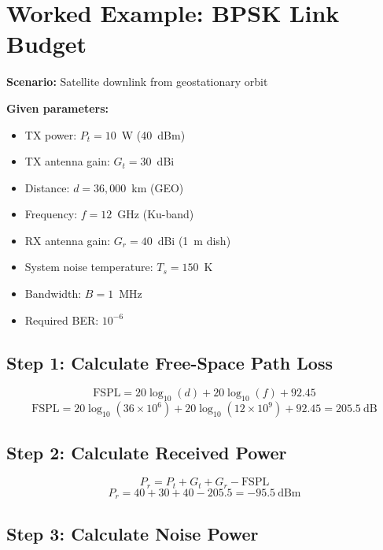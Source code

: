 \section{Worked Example: BPSK Link Budget}

\textbf{Scenario:} Satellite downlink from geostationary orbit

\textbf{Given parameters:}
\begin{itemize}
\item TX power: $P_t = 10$~W (40~dBm)
\item TX antenna gain: $G_t = 30$~dBi
\item Distance: $d = 36{,}000$~km (GEO)
\item Frequency: $f = 12$~GHz (Ku-band)
\item RX antenna gain: $G_r = 40$~dBi (1~m dish)
\item System noise temperature: $T_s = 150$~K
\item Bandwidth: $B = 1$~MHz
\item Required BER: $10^{-6}$
\end{itemize}

\subsection{Step 1: Calculate Free-Space Path Loss}

\begin{equation}
\mathrm{FSPL} = 20\log_{10}(d) + 20\log_{10}(f) + 92.45
\end{equation}
\begin{equation}
\mathrm{FSPL} = 20\log_{10}(36 \times 10^6) + 20\log_{10}(12 \times 10^9) + 92.45 = 205.5\ \text{dB}
\end{equation}

\subsection{Step 2: Calculate Received Power}

\begin{equation}
P_r = P_t + G_t + G_r - \mathrm{FSPL}
\end{equation}
\begin{equation}
P_r = 40 + 30 + 40 - 205.5 = -95.5\ \text{dBm}
\end{equation}

\subsection{Step 3: Calculate Noise Power}


